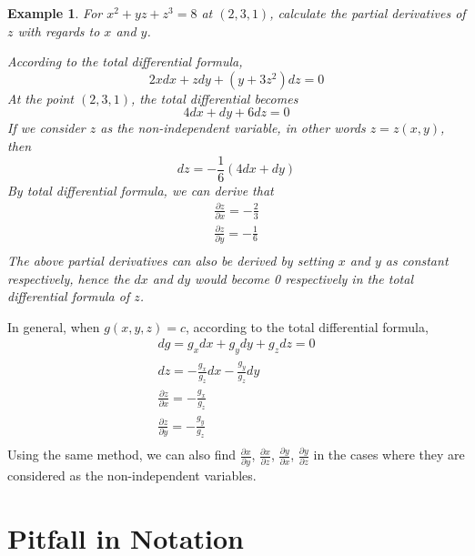 \documentclass{article}
\newtheorem{example}{Example}
\begin{document}
\begin{example}
  For $x^2 + yz + z^3 = 8$ at $(2, 3, 1)$, calculate the partial derivatives of 
  $z$ with regards to $x$ and $y$.

  According to the total differential formula,
  \begin{equation*}
    2xdx + zdy + (y + 3z^2)dz = 0
  \end{equation*}
  At the point $(2, 3, 1)$, the total differential becomes
  \begin{equation*}
    4dx + dy + 6dz = 0
  \end{equation*}
  If we consider $z$ as the non-independent variable, in other words 
  $z = z(x, y)$, then
  \begin{equation*}
    dz = -\frac{1}{6}(4dx + dy)
  \end{equation*}
  By total differential formula, we can derive that
  \begin{gather*}
    \frac{\partial z}{\partial x} = -\frac{2}{3} \\
    \frac{\partial z}{\partial y} = -\frac{1}{6} \\
  \end{gather*}
  The above partial derivatives can also be derived by setting $x$ and $y$ as 
  constant respectively, hence the $dx$ and $dy$ would become 0 respectively in 
  the total differential formula of $z$.
\end{example}

In general, when $g(x, y, z) = c$, according to the total differential formula,
\begin{gather*}
  dg = g_xdx + g_ydy + g_zdz = 0 \\
  dz = -\frac{g_x}{g_z}dx - \frac{g_y}{g_z}dy \\
  \frac{\partial z}{\partial x} = -\frac{g_x}{g_z} \\
  \frac{\partial z}{\partial y} = -\frac{g_y}{g_z} \\
\end{gather*}
Using the same method, we can also find $\frac{\partial x}{\partial y}$, 
$\frac{\partial x}{\partial z}$, $\frac{\partial y}{\partial x}$, 
$\frac{\partial y}{\partial z}$ in the cases where they are considered as the 
non-independent variables.

\section{Pitfall in Notation}
\end{document}
